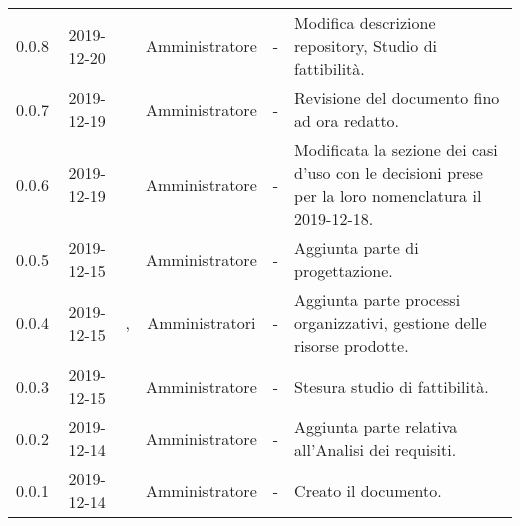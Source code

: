 {\begin{longtable}{ c c  C{2.5cm} c C{3cm} C{3.5cm}}
0.0.8 & 2019-12-20 & \MC{} & Amministratore & - & Modifica descrizione repository, Studio di fattibilità. \\

0.0.7 & 2019-12-19 & \SE{} & Amministratore & - & Revisione del documento fino ad ora redatto. \\

0.0.6 & 2019-12-19 & \CE{} & Amministratore & - & Modificata la sezione dei casi d’uso con le decisioni prese per la loro nomenclatura il 2019-12-18. \\

0.0.5 & 2019-12-15 & \SE{} & Amministratore & - & Aggiunta parte di progettazione. \\

0.0.4 & 2019-12-15 & \BR{}, \PF{} & Amministratori & - & Aggiunta parte processi organizzativi, gestione delle risorse prodotte. \\

0.0.3 & 2019-12-15 & \MC{} & Amministratore & - & Stesura studio di fattibilità. \\

0.0.2 & 2019-12-14 & \CE{} & Amministratore & - & Aggiunta parte relativa all’Analisi dei requisiti. \\

0.0.1 & 2019-12-14 & \CE{} & Amministratore & - & Creato il documento. \\
		
\end{longtable}
}
